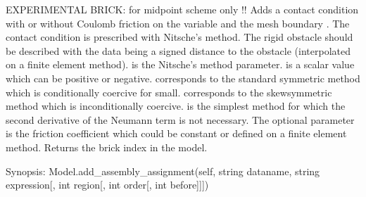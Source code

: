 \documentclass[a4paper,11pt,english]{sphinxmanual}
\begin{document}
\begin{fulllineitems}
\begin{fulllineitems}
\label{\detokenize{python/cmdref_Model:getfem.Model.add_Nitsche_midpoint_contact_with_rigid_obstacle_brick}}
EXPERIMENTAL BRICK: for midpoint scheme only !!
Adds a contact condition with or without Coulomb friction on the variable
 and the mesh boundary . The contact condition
is prescribed with Nitsche’s method. The rigid obstacle should
be described with the data  being a signed distance to
the obstacle (interpolated on a finite element method).
 is the Nitsche’s method parameter.
 is a scalar value which can be
positive or negative.  corresponds to the standard symmetric
method which is conditionally coercive for   small.
 corresponds to the skew\sphinxhyphen{}symmetric method which is
inconditionally coercive.  is the simplest method
for which the second derivative of the Neumann term is not necessary.
The optional parameter  is the friction
coefficient which could be constant or defined on a finite element
method.
Returns the brick index in the model.

\end{fulllineitems}


\begin{fulllineitems}
\label{\detokenize{python/cmdref_Model:getfem.Model.add_assembly_assignment}}
Synopsis: Model.add\_assembly\_assignment(self, string dataname, string expression{[}, int region{[}, int order{[}, int before{]}{]}{]})


\end{fulllineitems}
\end{fulllineitems}
\end{document}
